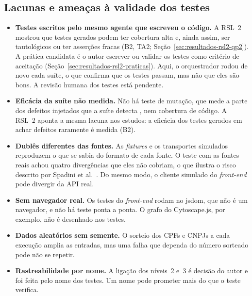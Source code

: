 \subsection{Lacunas e ameaças à validade dos testes}
\label{sec:desenv-testes-lacunas}

\begin{itemize}
	\item \textbf{Testes escritos pelo mesmo agente que escreveu o código.}
	A RSL~2 mostrou que testes gerados podem ter cobertura alta e, ainda
	assim, ser tautológicos ou ter asserções fracas (B2, TA2;
	Seção~\ref{sec:resultados-rsl2-qp2}). A prática candidata é o autor
	escrever ou validar os testes como critério de aceitação
	(Seção~\ref{sec:resultados-rsl2-praticas}). Aqui, o orquestrador rodou de
	novo cada suíte, o que confirma que os testes passam, mas não que eles
	são bons. A revisão humana dos testes está pendente.
	\item \textbf{Eficácia da suíte não medida.} Não há teste de mutação, que
	mede a parte dos defeitos injetados que a suíte detecta
	\cite[cap.~5, seç.~3.4 e~4.2.2]{swebok4}, nem cobertura de código. A
	RSL~2 aponta a mesma lacuna nos estudos: a eficácia dos testes gerados em
	achar defeitos raramente é medida (B2).
	\item \textbf{Dublês diferentes das fontes.} As \textit{fixtures} e os
	transportes simulados reproduzem o que se sabia do formato de cada fonte.
	O teste com as fontes reais achou quatro divergências que eles não
	cobriam, o que ilustra o risco descrito por Spadini et
	al.\ \cite{spadini2017mock}. Do mesmo modo, o cliente simulado do
	\textit{front-end} pode divergir da API real.
	\item \textbf{Sem navegador real.} Os testes do \textit{front-end} rodam
	no jsdom, que não é um navegador, e não há teste ponta a ponta. O grafo
	do Cytoscape.js, por exemplo, não é desenhado nos testes.
	\item \textbf{Dados aleatórios sem semente.} O sorteio dos CPFs e CNPJs a
	cada execução amplia as entradas, mas uma falha que dependa do número
	sorteado pode não se repetir.
	\item \textbf{Rastreabilidade por nome.} A ligação dos níveis~2 e~3 é
	decisão do autor e foi feita pelo nome dos testes. Um nome pode prometer
	mais do que o teste verifica.
\end{itemize}

